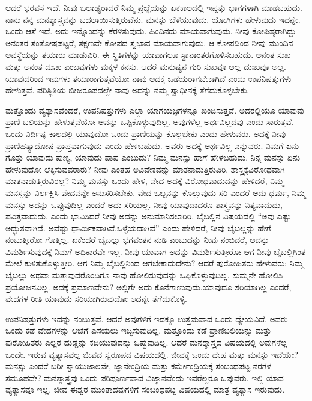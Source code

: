 ಆದರೆ ಭರವಸೆ ಇದೆ. ನೀವು ಬಲಾಢ್ಯರಾದರೆ ನಿಮ್ಮ ಪ್ರಜ್ಞೆಯನ್ನು ಏಕಕಾಲದಲ್ಲಿ ಇಪ್ಪತ್ತು ಭಾಗಗಳಾಗಿ ಮಾಡಬಹುದು. ನಾನು ನನ್ನ ಮನಶ್ಶಾಸ್ತ್ರವನ್ನು ಬದಲಾಯಿಸುತ್ತಿರುವೆನು. ಮನಸ್ಸು ಬೆಳೆಯುವುದು. ಯೋಗಿಗಳು ಹೇಳುವುದು ಇದನ್ನೇ. ಒಂದು ಆಸೆ ಇದೆ. ಅದು ಇನ್ನೊಂದನ್ನು ಕೆರಳಿಸುವುದು. ಹಿಂದಿನದು ಮಾಯವಾಗುವುದು. ನೀವು ಕೋಪಿಷ್ಠರಾಗಿದ್ದು ಅನಂತರ ಸಂತೋಷಪಟ್ಟರೆ, ತಕ್ಷಣವೇ ಕೋಪದ ಸ್ವಭಾವ ಮಾಯವಾಗುವುದು. ಆ ಕೋಪದಿಂದ ನೀವು ಮುಂದಿನ ಅವಸ್ಥೆಯನ್ನು ತಯಾರು ಮಾಡುವಿರಿ. ಈ ಸ್ಥಿತಿಗಳನ್ನು ಯಾವಾಗಲೂ ಸ್ಥಾನಾಂತರಗೊಳಿಸಬಹುದು. ಅನಂತ ಸುಖ ಮತ್ತು ಅನಂತ ದುಃಖ ಎಂಬವುಗಳು ಮಕ್ಕಳ ಕನಸು. ಆದರೆ ಮನುಷ್ಯನ ಗುರಿ ಸುಖವೂ ಅಲ್ಲ ದುಃಖವೂ ಅಲ್ಲ. ಯಾವುದರಿಂದ ಇವುಗಳು ತಯಾರಾಗುತ್ತವೆಯೋ ನಾವು ಅದಕ್ಕೆ ಒಡೆಯರಾಗಬೇಕಾಗಿದೆ ಎಂದು ಉಪನಿಷತ್ತುಗಳು ಹೇಳುತ್ತವೆ. ಪರಿಸ್ಥಿತಿಯ ಬೀಜರೂಪದಲ್ಲೇ ನಾವು ಅದನ್ನು ನಮ್ಮ ಸ್ವಾಧೀನಕ್ಕೆ ತೆಗೆದುಕೊಳ್ಳಬೇಕು.

ಮತ್ತೊಂದು ವ್ಯತ್ಯಾಸವೆಂದರೆ, ಉಪನಿಷತ್ತುಗಳು ಎಲ್ಲಾ ಯಾಗಯಜ್ಞಗಳನ್ನೂ ಖಂಡಿಸುತ್ತವೆ. ಅದರಲ್ಲಿಯೂ ಯಾವುವು ಪ್ರಾಣಿ ಬಲಿಯನ್ನು ಹೇಳುತ್ತವೆಯೋ ಅವನ್ನು ಒಪ್ಪಿಕೊಳ್ಳುವುದಿಲ್ಲ. ಅವುಗಳೆಲ್ಲ ಅರ್ಥವಿಲ್ಲದವು ಎಂದು ಸಾರುತ್ತವೆ. ಒಂದು ನಿರ್ದಿಷ್ಟ ಕಾಲದಲ್ಲಿ ಯಾವುದೋ ಒಂದು ಪ್ರಾಣಿಯನ್ನು ಕೊಲ್ಲಬೇಕು ಎಂದು ಹೇಳುವರು. ಅದಕ್ಕೆ ನೀವು ಪ್ರಾಣಿಹತ್ಯಾದೋಷ ಪ್ರಾಪ್ತವಾಗುವುದು ಎಂದು ಹೇಳಬಹುದು. ಅವರು ಅದಕ್ಕೆ ಅರ್ಥವಿಲ್ಲ ಎನ್ನುವರು. ನಿಮಗೆ ಏನು ಗೊತ್ತು ಯಾವುದು ಪುಣ್ಯ, ಯಾವುದು ಪಾಪ ಎಂಬುದು? ನಿಮ್ಮ ಮನಸ್ಸು ಹಾಗೆ ಹೇಳಬಹುದು. ನಿನ್ನ ಮನಸ್ಸು ಏನು ಹೇಳುವುದೋ ಲೆಕ್ಕಿಸುವವರಾರು? ನೀವು ಎಂತಹ ಅವಿವೇಕವನ್ನು ಮಾತನಾಡುತ್ತಿರುವಿರಿ. ಶಾಸ್ತ್ರಕ್ಕೆ\break ವಿರೋಧವಾಗಿ ಮಾತನಾಡುತ್ತಿರುವಿರಲ್ಲ? ನಿಮ್ಮ ಮನಸ್ಸು ಒಂದು ಹೇಳಿ, ವೇದ ಅದಕ್ಕೆ ವಿರೋಧವಾದುದನ್ನು ಹೇಳಿದರೆ, ನಿಮ್ಮ ಮನಸ್ಸನ್ನು ನಿರ್ಲಕ್ಷಿಸಿ ವೇದವನ್ನೇ ಅನುಸರಿಸಬೇಕು. ವೇದ ಒಬ್ಬನನ್ನು ಕೊಲ್ಲುವುದು ಸರಿ ಎಂದರೆ ಅದು ಧರ್ಮ, ನಿಮ್ಮ ಮನಸ್ಸು ಅದನ್ನು ಒಪ್ಪುವುದಿಲ್ಲ ಎಂದರೆ ಅದು ಸರಿಯಲ್ಲ. ನೀವು ಯಾವುದಾದರೂ ಶಾಸ್ತ್ರವನ್ನು ನಿತ್ಯವಾದುದು, ಪವಿತ್ರವಾದುದು, ಎಂದು ಭಾವಿಸಿದರೆ ನೀವು ಅದನ್ನು ಅನುಮಾನಿಸಲಾರಿರಿ. ಬೈಬಲ್ಲಿನ ವಿಷಯದಲ್ಲಿ “ಅವು ಎಷ್ಟು ಅದ್ಭುತವಾಗಿದೆ. ಅವೆಷ್ಟು ಧಾರ್ಮಿಕವಾಗಿವೆ.\break ಒಳ್ಳೆಯದಾಗಿವೆ” ಎಂದು ಹೇಳಿದರೆ, ನೀವು ಬೈಬಲ್ಲನ್ನು ಹೇಗೆ ನಂಬುತ್ತೀರೋ ಗೊತ್ತಿಲ್ಲ. ಏಕೆಂದರೆ ಬೈಬಲ್ಲು ಭಗವಂತನ ನುಡಿ ಎಂಬುದನ್ನು ನೀವು ನಂಬಿದರೆ, ಅದನ್ನು ವಿಮ\-ರ್ಶಿಸುವುದಕ್ಕೆ ನಿಮಗೆ ಅಧಿಕಾರವೇ ಇಲ್ಲ. ನೀವು ಯಾವಾಗ ಅದನ್ನು ವಿಮರ್ಶಿಸುತ್ತೀರೋ ಆಗ ನೀವು ಬೈಬಲ್ಲಿಗಿಂತ ಮೇಲೆ ಕುಳಿತುಕೊಳ್ಳುತ್ತೀರಿ. ಆಗ ನಿಮ್ಮ ಬೈಬಲ್ಲಿನಿಂದ ಆಗ\-ಬೇಕಾದುದೇನು? ಆದರೆ ಪುರೋಹಿತರು ಹೇಳುವರು: ನಿಮ್ಮ ಬೈಬಲ್ಲು ಅಥವಾ ಮತ್ತಾವುದರೊಂದಿಗೂ ನಾವು ಹೋಲಿಸುವುದನ್ನು ಒಪ್ಪಿಕೊಳ್ಳುವುದಿಲ್ಲ. ಸುಮ್ಮನೇ ಹೋಲಿಸಿ ಪ್ರಯೋಜನವಿಲ್ಲ. ಅದಕ್ಕೆ ಪ್ರಮಾಣವೇನು? ಅಲ್ಲಿಗೇ ಅದು ಕೊನೆಗಾಣುವುದು.\break ಯಾವುದೂ ಸರಿಯಾಗಿಲ್ಲ ಎಂದರೆ, ವೇದಗಳ ರೀತಿ ಯಾವುದು ಸರಿಯಾಗಿರುವುದೋ ಅದನ್ನೇ ತೆಗೆದುಕೊಳ್ಳಿ.

ಉಪನಿಷತ್ತುಗಳು ಇದನ್ನು ನಂಬುತ್ತವೆ. ಆದರೆ ಅವುಗಳಿಗೆ ಇದಕ್ಕೂ ಉತ್ತಮವಾದ ಒಂದು ಧ್ಯೇಯವಿದೆ. ಅವರು ಒಂದು ಕಡೆ ವೇದಗಳನ್ನು ಆಚೆಗೆ ಎಸೆಯಲು ಇಚ್ಛಿಸುವು\-ದಿಲ್ಲ. ಮತ್ತೊಂದು ಕಡೆ ಪ್ರಾಣಿಬಲಿಯನ್ನು ಮತ್ತು ಪುರೋಹಿತರು ಎಲ್ಲರ ದುಡ್ಡನ್ನು ಕದಿಯುವುದನ್ನು ಒಪ್ಪುವುದಿಲ್ಲ. ಆದರೆ ಮನಶ್ಶಾಸ್ತ್ರದ ವಿಷಯದಲ್ಲಿ ಅವುಗಳೆಲ್ಲ ಒಂದೇ. ಇರುವ ವ್ಯತ್ಯಾಸವೆಲ್ಲ ಜೀವದ ಸ್ವರೂಪದ ವಿಷಯದಲ್ಲಿ. ಜೀವಕ್ಕೆ ಒಂದು ದೇಹ ಮತ್ತು ಮನಸ್ಸು ಇದೆಯೇ? ಮನಸ್ಸು ಎಂದರೆ ಬರೀ ಸ್ನಾಯುಜಾಲವೇ, ಜ್ಞಾನೇಂದ್ರಿಯ ಮತ್ತು ಕರ್ಮೇಂದ್ರಿಯಕ್ಕೆ ಸಂಬಂಧಪಟ್ಟ ನರಗಳ ಸಮೂಹವೇ? ಮನಶ್ಶಾಸ್ತ್ರವು ಒಂದು ಪರಿಪೂರ್ಣ\-ವಾದ ವಿಜ್ಞಾನವೆಂದು ಇವರೆಲ್ಲರೂ ಒಪ್ಪುವರು. ಇಲ್ಲಿ ಯಾವ ವ್ಯತ್ಯಾಸವೂ ಇಲ್ಲ. ಜೀವ ಈಶ್ವರ ಮುಂತಾದವುಗಳಿಗೆ ಸಂಬಂಧಪಟ್ಟ ವಿಷಯದಲ್ಲಿ ಮಾತ್ರ ವ್ಯತ್ಯಾಸ ಇರುವುದು.

